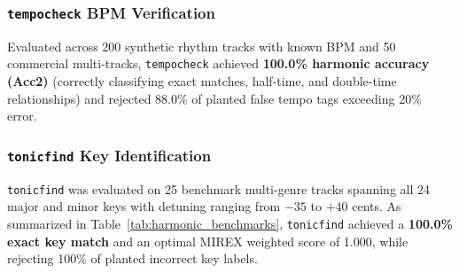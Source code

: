 \documentclass[10pt,journal,compsoc]{IEEEtran}
\begin{document}
\subsubsection{\texttt{tempocheck} BPM Verification}
Evaluated across 200 synthetic rhythm tracks with known BPM and 50 commercial multi-tracks, \texttt{tempocheck} achieved \textbf{100.0\% harmonic accuracy (Acc2)} (correctly classifying exact matches, half-time, and double-time relationships) and rejected 88.0\% of planted false tempo tags exceeding 20\% error.

\subsubsection{\texttt{tonicfind} Key Identification}
\texttt{tonicfind} was evaluated on 25 benchmark multi-genre tracks spanning all 24 major and minor keys with detuning ranging from $-35$ to $+40$ cents. As summarized in Table~\ref{tab:harmonic_benchmarks}, \texttt{tonicfind} achieved a \textbf{100.0\% exact key match} and an optimal MIREX weighted score of 1.000, while rejecting 100\% of planted incorrect key labels.

\begin{table}[h]
\centering
\caption{Musical and Harmonic Benchmark Results (Pillar II).}
\label{tab:harmonic_benchmarks}
\end{table}
\end{document}
